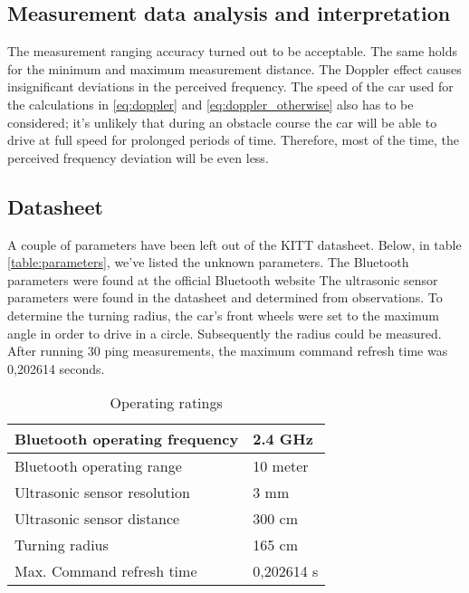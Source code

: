 \documentclass[final]{scrreprt} %
\begin{document}
\subsection{Measurement data analysis and interpretation}

The measurement ranging accuracy turned out to be acceptable. 
The same holds for the minimum and maximum measurement distance. 
The Doppler effect causes insignificant deviations in the perceived frequency. 
The speed of the car used for the calculations in \ref{eq:doppler} and \ref{eq:doppler_otherwise} also has to be considered; it's unlikely that during an obstacle course the car will be able to drive at full speed for prolonged periods of time.
Therefore, most of the time, the perceived frequency deviation will be even less.

\subsection{Datasheet}

A couple of parameters have been left out of the KITT datasheet. Below, in table \ref{table:parameters}, we've listed the unknown parameters. The Bluetooth parameters were found at the official Bluetooth website %
The ultrasonic sensor parameters were found in the datasheet and determined from observations. 
To determine the turning radius, the car's front wheels were set to the maximum angle in order to drive in a circle. Subsequently the radius could be measured. 
After running 30 ping measurements, the maximum command refresh time was 0,202614 seconds.

\begin{table}[H]
\begin{center}
\begin{tabular}{ | l | l |}
    \hline
    Bluetooth operating frequency & 2.4 GHz \\ \hline
    Bluetooth operating range & 10 meter \\\hline
    Ultrasonic sensor resolution    & 3 mm \\\hline
    Ultrasonic sensor distance	         & 300 cm \\\hline
    Turning radius & 165 cm \\\hline
    Max. Command refresh time & 0,202614 s\\\hline
\end{tabular}
\caption{Operating ratings}
\end{center}
\end{table}
\label{table:parameters}
\end{document}
